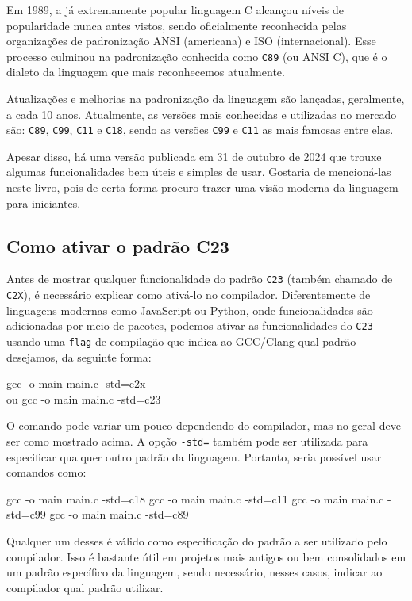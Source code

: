 Em 1989, a já extremamente popular linguagem C alcançou níveis de popularidade 
nunca antes vistos, sendo oficialmente reconhecida pelas organizações de 
padronização ANSI (americana) e ISO (internacional). Esse processo culminou na 
padronização conhecida como \texttt{C89} (ou ANSI C), que é o dialeto da 
linguagem que mais reconhecemos atualmente.

Atualizações e melhorias na padronização da linguagem são lançadas, geralmente, 
a cada 10 anos. Atualmente, as versões mais conhecidas e utilizadas no mercado 
são: \texttt{C89}, \texttt{C99}, \texttt{C11} e \texttt{C18}, sendo as versões 
\texttt{C99} e \texttt{C11} as mais famosas entre elas.

Apesar disso, há uma versão publicada em 31 de outubro de 2024 que trouxe 
algumas funcionalidades bem úteis e simples de usar. Gostaria de mencioná-las 
neste livro, pois de certa forma procuro trazer uma visão moderna da linguagem 
para iniciantes.

\subsection{Como ativar o padrão C23}

Antes de mostrar qualquer funcionalidade do padrão \texttt{C23} (também chamado 
de \texttt{C2X}), é necessário explicar como ativá-lo no compilador. 
Diferentemente de linguagens modernas como JavaScript ou Python, onde 
funcionalidades são adicionadas por meio de pacotes, podemos ativar as 
funcionalidades do \texttt{C23} usando uma \texttt{flag} de compilação que 
indica ao GCC/Clang qual padrão desejamos, da seguinte forma:

\newpage
\begin{textbox}
    gcc -o main main.c -std=c2x
    \\ ou
    gcc -o main main.c -std=c23
\end{textbox}

O comando pode variar um pouco dependendo do compilador, mas no geral deve ser 
como mostrado acima. A opção \texttt{-std=} também pode ser utilizada para 
especificar qualquer outro padrão da linguagem. Portanto, seria possível usar 
comandos como:

\begin{textbox}
    gcc -o main main.c -std=c18
    gcc -o main main.c -std=c11
    gcc -o main main.c -std=c99
    gcc -o main main.c -std=c89
\end{textbox}

Qualquer um desses é válido como especificação do padrão a ser utilizado pelo 
compilador. Isso é bastante útil em projetos mais antigos ou bem consolidados em 
um padrão específico da linguagem, sendo necessário, nesses casos, indicar ao 
compilador qual padrão utilizar.

